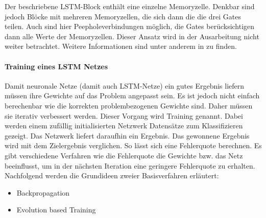 Der beschriebene \ac{LSTM}-Block enthält eine einzelne Memoryzelle. Denkbar sind
jedoch Blöcke mit mehreren Memoryzellen, die sich dann die die drei Gates
teilen. Auch sind hier Peepholeverbindungen möglich, die Gates berücksichtigen
dann alle Werte der Memoryzellen. Dieser Ansatz wird in der Ausarbeitung nicht
weiter betrachtet. Weitere Informationen sind unter anderem in \cite{GERS2001}
zu finden.

\paragraph{Training eines \ac{LSTM} Netzes}
Damit neuronale Netze (damit auch \ac{LSTM}-Netze) ein gutes
Ergebnis liefern müssen ihre Gewichte auf das Problem angepasst sein. Es ist
jedoch nicht einfach berechenbar wie die korrekten problembezogenen Gewichte
sind. Daher müssen sie iterativ verbessert werden. Dieser Vorgang wird Training
genannt. Dabei werden einem zufällig initialisierten Netzwerk Datensätze zum
Klassifizieren gezeigt. Das Netzwerk liefert daraufhin ein Ergebnis. Das
gewonnene Ergebnis wird mit dem Zielergebnis verglichen. So lässt sich eine
Fehlerquote berechnen. Es gibt verschiedene Verfahren wie die Fehlerquote die
Gewichte bzw. das Netz beeinflusst, um in der nächsten Iteration eine geringere
Fehlerquote zu erhalten. Nachfolgend werden die Grundideen zweier Basisverfahren
erläutert:
\begin{itemize}
	\item Backpropagation
	\item Evolution based Training
\end{itemize}

